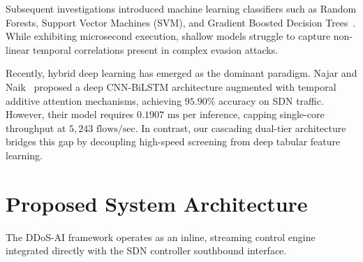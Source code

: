 \documentclass[journal]{IEEEtran}
\begin{document}
Subsequent investigations introduced machine learning classifiers such as Random Forests, Support Vector Machines (SVM), and Gradient Boosted Decision Trees~\cite{ke2017lightgbm}. While exhibiting microsecond execution, shallow models struggle to capture non-linear temporal correlations present in complex evasion attacks.

Recently, hybrid deep learning has emerged as the dominant paradigm. Najar and Naik~\cite{najar2024cybersecure, najar2025ddos} proposed a deep CNN-BiLSTM architecture augmented with temporal additive attention mechanisms, achieving $95.90\%$ accuracy on SDN traffic. However, their model requires $0.1907\text{ ms}$ per inference, capping single-core throughput at $5,243\text{ flows/sec}$. In contrast, our cascading dual-tier architecture bridges this gap by decoupling high-speed screening from deep tabular feature learning.

\section{Proposed System Architecture}
The DDoS-AI framework operates as an inline, streaming control engine integrated directly with the SDN controller southbound interface.
\end{document}
